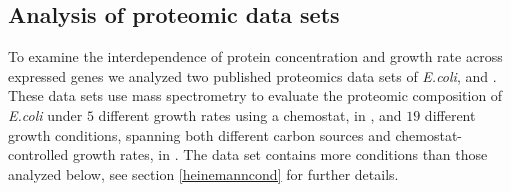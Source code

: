 \subsection{Analysis of proteomic data sets}
To examine the interdependence of protein concentration and growth rate across expressed genes we analyzed two published proteomics data sets of \emph{E.coli}, \cite{Valgepea2013} and \cite{Heinemann2014}.
These data sets use mass spectrometry to evaluate the proteomic composition of \emph{E.coli} under $5$ different growth rates using a chemostat, in \cite{Valgepea2013}, and $19$ different growth conditions, spanning both different carbon sources and chemostat-controlled growth rates, in \cite{Heinemann2014}.
The \cite{Heinemann2014} data set contains more conditions than those analyzed below, see section \ref{heinemanncond} for further details.